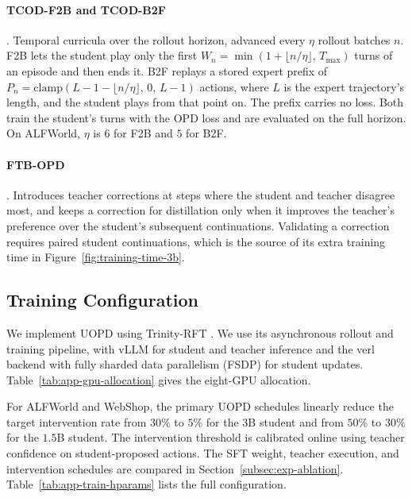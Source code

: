 \paragraph{TCOD-F2B and TCOD-B2F} \citep{wang2026exploring}. Temporal curricula over the rollout horizon,
advanced every $\eta$ rollout batches $n$. F2B lets the student play only the first
$W_n = \min(1+\lfloor n/\eta\rfloor,\,T_{\max})$ turns of an episode and then ends it. B2F replays a
stored expert prefix of $P_n = \mathrm{clamp}(L-1-\lfloor n/\eta\rfloor,\,0,\,L-1)$ actions, where $L$ is
the expert trajectory's length, and the student plays from that point on. The prefix carries no loss.
Both train the student's turns with the OPD loss and are evaluated on the full horizon. On ALFWorld,
$\eta$ is $6$ for F2B and $5$ for B2F.

\paragraph{FTB-OPD} \citep{futurebridgeopd2026}. Introduces teacher corrections at steps where the
student and teacher disagree most, and keeps a correction for distillation only when it improves the
teacher's preference over the student's subsequent continuations. Validating a correction requires
paired student continuations, which is the source of its extra training time in
Figure~\ref{fig:training-time-3b}.

\subsection{Training Configuration}
\label{app:training-config}

We implement UOPD using Trinity-RFT \citep{pan2025trinityrft}.
We use its asynchronous rollout and training
pipeline, with vLLM for student and teacher inference and the verl backend
with fully sharded data parallelism (FSDP) for student
updates. Table~\ref{tab:app-gpu-allocation} gives the eight-GPU allocation.

For ALFWorld and WebShop, the primary UOPD schedules linearly reduce the target intervention
rate from $30\%$ to $5\%$ for the $3$B student and from $50\%$ to $30\%$ for the $1.5$B student.
The intervention threshold is calibrated online using teacher confidence on student-proposed actions.
The SFT weight, teacher execution, and intervention schedules are compared in
Section~\ref{subsec:exp-ablation}. Table~\ref{tab:app-train-hparams} lists the full configuration.

